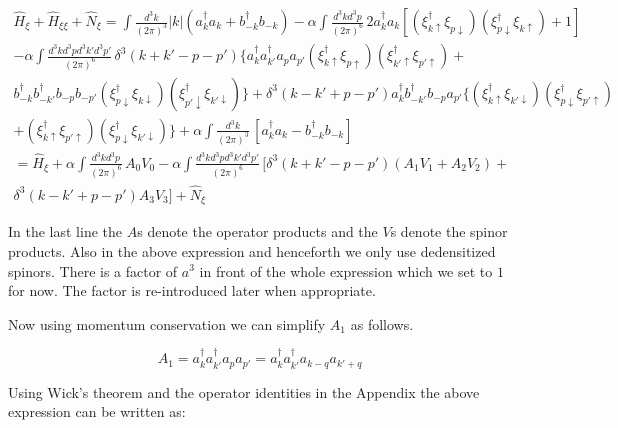 \begin{doublespace}
\begin{multline}\label{InteractionTerm}
    \hat H_{\xi} + \hat H_{\xi\xi} + \hat N_{\xi} =
    \int \frac{d^3k}{(2\pi)^3} |k|(a^\dag_k a_k + b^\dag_{-k} b_{-k}) -
    \alpha  \int \frac{d^3k d^3p}{(2\pi)^6}\,
    2 a^\dag_k a_k \left[
    \left(\xi^\dag_{k\uparrow}\xi_{p\downarrow}\right)\left(\xi^\dag_{p\downarrow}\xi_{k\uparrow}\right)
    +{}1 \right] \\
    -{}\alpha  \int \frac{d^3k d^3p d^3k'd^3p'}{(2\pi)^6}\, \delta^3(k+k'-p-p')
    \bigg\{
    a^\dag_k a^\dag_{k'} a_p a_{p'}\left(\xi^\dag_{k\uparrow}\xi_{p\uparrow}\right)\left(\xi^\dag_{k'\uparrow}\xi_{p'\uparrow}\right)
    + \\
    b^\dag_{-k} b^\dag_{-k'} b_{-p} b_{-p'} \left(\xi^\dag_{p\downarrow}\xi_{k\downarrow}\right)\left(\xi^\dag_{p'\downarrow}\xi_{k'\downarrow}\right)
    \bigg\} + \delta^3(k-k'+p-p')
    a^\dag_k b^\dag_{-k'} b_{-p} a_{p'} \bigg\{
    \left(\xi^\dag_{k\uparrow}\xi_{k'\downarrow}\right)\left(\xi^\dag_{p\downarrow}\xi_{p'\uparrow}\right)
    \\
    + \left(\xi^\dag_{k\uparrow}\xi_{p'\uparrow}\right)\left(\xi^\dag_{p\downarrow}\xi_{k'\downarrow}\right)
    \bigg\} + \alpha  \int \frac{d^3k}{(2\pi)^3}\, \left[a^\dag_k a_k - b^\dag_{-k} b_{-k} \right]\\
    = \hat H_{\xi} + \alpha  \int \frac{d^3k d^3p}{(2\pi)^6}\, A_0 V_0
    -\alpha  \int \frac{d^3k d^3p d^3k'd^3p'}{(2\pi)^6}\, \big[\delta^3(k+k'-p-p')(A_1 V_1 + A_2 V_2) +  \\
    \delta^3(k-k'+p-p') A_3 V_3 \big] + \hat N_{\xi}
\end{multline}

In the last line the $A${\small s} denote the operator products and the $V${\small s} denote the
spinor products. Also in the above expression and henceforth we only use dedensitized spinors.
There is a factor of $a^3$ in front of the whole expression which we set to $1$ for now. The factor
is re-introduced later when appropriate.

Now using momentum conservation we can simplify $A_1$ as follows.

\begin{equation}
    A_{1} = a^\dag_k a^\dag_{k'} a_p a_{p'} = a^\dag_k a^\dag_{k'} a_{k-q} a_{k'+q}
\end{equation}

Using Wick's theorem and the operator identities in the Appendix the above expression can be
written as:


\end{doublespace}
